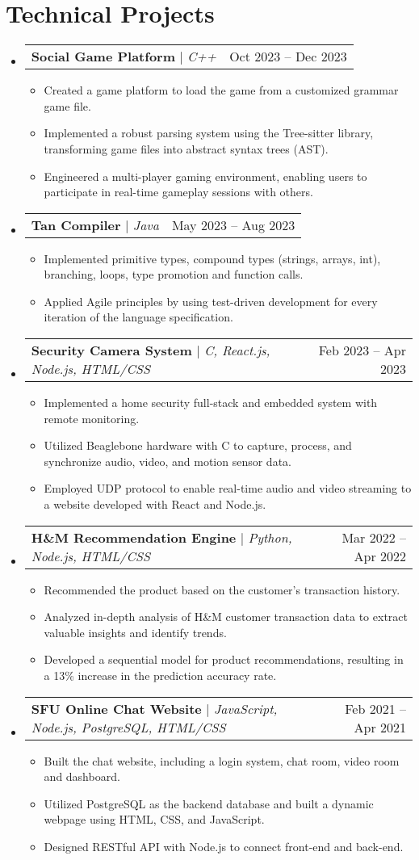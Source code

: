 \documentclass[letterpaper,11pt]{article}
\makeatletter
\newcommand{\resumeItem}[1]{
  \item\small{
    {#1 \vspace{-2pt}}
  }
}
\newcommand{\resumeProjectHeading}[2]{
    \item
    \begin{tabular*}{0.97\textwidth}{l@{\extracolsep{\fill}}r}
      \small#1 & #2 \\
    \end{tabular*}\vspace{-7pt}
}
\newcommand{\resumeSubHeadingListStart}{\begin{itemize}[leftmargin=0.15in, label={}]}
\newcommand{\resumeSubHeadingListEnd}{\end{itemize}}
\newcommand{\resumeItemListStart}{\begin{itemize}}
\newcommand{\resumeItemListEnd}{\end{itemize}\vspace{-5pt}}
\makeatother
\begin{document}


\section{Technical Projects}
  \resumeSubHeadingListStart
    \resumeProjectHeading
        {\textbf{Social Game Platform} $|$ \emph{C++}}{Oct 2023 -- Dec 2023}
        \resumeItemListStart
            \resumeItem{Created a game platform to load the game from a customized grammar game file.}
            \resumeItem{Implemented a robust parsing system using the Tree-sitter library, transforming game files into abstract syntax trees (AST).}
            \resumeItem{Engineered a multi-player gaming environment, enabling users to participate in real-time gameplay sessions with others.}
        \resumeItemListEnd
    \resumeProjectHeading
        {\textbf{Tan Compiler} $|$ \emph{Java}}{May 2023 -- Aug 2023}
        \resumeItemListStart
            \resumeItem{Implemented primitive types, compound types (strings, arrays, int), branching, loops, type promotion and function calls.}
            \resumeItem{Applied Agile principles by using test-driven development for every iteration of the language specification.}
        \resumeItemListEnd
    \resumeProjectHeading
        {\textbf{Security Camera System} $|$ \emph{C, React.js, Node.js, HTML/CSS}}{Feb 2023 -- Apr 2023}
        \resumeItemListStart
            \resumeItem{Implemented a home security full-stack and embedded system with remote monitoring.}
            \resumeItem{Utilized Beaglebone hardware with C to capture, process, and synchronize audio, video, and motion sensor data.}
            \resumeItem{Employed UDP protocol to enable real-time audio and video streaming to a website developed with React and Node.js.}
        \resumeItemListEnd
    \resumeProjectHeading
        {\textbf{H\&M Recommendation Engine} $|$ \emph{Python, Node.js, HTML/CSS}}{Mar 2022 -- Apr 2022}
        \resumeItemListStart
            \resumeItem{Recommended the product based on the customer's transaction history.}
            \resumeItem{Analyzed in-depth analysis of H\&M customer transaction data to extract valuable insights and identify trends.}
            \resumeItem{Developed a sequential model for product recommendations, resulting in a 13\% increase in the prediction accuracy rate.}
        \resumeItemListEnd
    \resumeProjectHeading
        {\textbf{SFU Online Chat Website} $|$ \emph{JavaScript, Node.js, PostgreSQL, HTML/CSS}}{Feb 2021 -- Apr 2021}
        \resumeItemListStart
            \resumeItem{Built the chat website, including a login system, chat room, video room and dashboard.}
            \resumeItem{Utilized PostgreSQL as the backend database and built a dynamic webpage using HTML, CSS, and JavaScript.}
            \resumeItem{Designed RESTful API with Node.js to connect front-end and back-end.}
        \resumeItemListEnd
  \resumeSubHeadingListEnd
\end{document}
